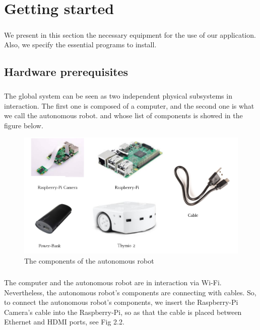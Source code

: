 \documentclass[12pt]{report}
\begin{document}
\chapter{Getting started}
\paragraph{}
We present in this section the necessary equipment for the use of our application. Also, we specify the essential programs to install.
\section{Hardware prerequisites}
\paragraph{}
The global system can be seen as two independent physical subsystems in interaction. The first one is composed of a computer, and the second one is what we call the autonomous robot. and whose list of components is showed in the figure below.
\begin{figure}[H]
	\begin{center}
		\includegraphics[scale=0.6]{res/comp.png}
		\caption{The components of the autonomous robot}
	\end{center}
\end{figure}
\paragraph{}
The computer and the autonomous robot are in interaction via Wi-Fi. Nevertheless, the autonomous robot's components are connecting with cables. 
So, to connect the autonomous robot's components, we insert the Raspberry-Pi Camera's cable into the Raspberry-Pi, so as that the cable is placed between Ethernet and HDMI ports, see Fig 2.2. 
\end{document}
